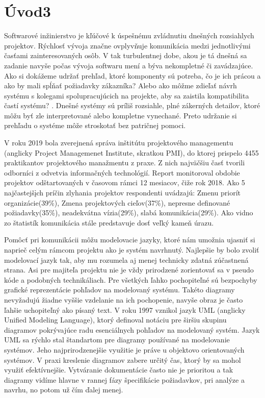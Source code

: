 \chapter{Úvod3}
Softwarové inžinierstvo je kľúčové k úspešnému zvládnutiu dnešných rozsiahlych projektov. Rýchlosť vývoja značne ovplyvňuje komunikácia medzi jednotlivými časťami zainteresovaných osôb. 
V tak turbulentnej dobe, akou je tá dnešná sa zadanie navyše počas vývoja softwaru mení a býva nekompletné či zavádzajúce.
Ako si dokážeme udržať prehľad, ktoré komponenty sú potreba, čo je ich prácou a ako by mali spĺňať požiadavky zákazníka? Alebo ako môžme zdieľať návrh systému s kolegami spolupracujúcich na projekte, aby sa zaistila kompatibilita častí systému?  \cite{hamilton2006learning}. Dnešné systémy sú príliš rozsiahle, plné zákerných detailov, ktoré môžu byť zle interpretované alebo kompletne vynechané. Preto udržanie si prehľadu o systéme môže stroskotať bez patričnej pomoci. 

V roku 2019 bola zverejnená správa inštitútu projektového managementu (anglicky Project Managemenet Institute, skratkou PMI), do ktorej prispelo 4455 praktikantov projektového manažmentu z praxe. Z nich najväčšiu časť tvorili odborníci z odvetvia informačných technológií. Report monitoroval obdobie projektov odštartovaných v časovom rámci 12 mesiacov, čiže rok 2018. Ako 5 najčastejšįch príčin zlyhania projektov respondenti uvádzajú: Zmenu priorít organizácie(39\%), Zmena projektových cieľov(37\%), nepresne definované požiadavky(35\%), neadekvátna vízia(29\%), slabá komunikácia(29\%).
Ako vidno zo štatistík komunikácia stále predstavuje dosť veľký kameň úrazu.

Pomôcť pri komunikácii môžu modelovacie jazyky, ktoré nám umožnia ujasniť si naprieč celým rámcom projektu ako je systém navrhnutý. Najlepšie by bolo zvoliť modelovací jazyk tak, aby mu rozumela aj menej technicky zdatná zúčastnená strana. Asi pre majiteľa projektu nie je vždy prirodzené zorientovať sa v pseudo kóde a podobných technikáliach. Pre všetkých ľahko pochopiteľné sú bezpochyby grafické reprezentácie pohľadov na modelovaný systému. Takéto diagramy nevyžadujú žiadne vyššie vzdelanie na ich pochopenie, navyše obraz je často ľahšie uchopiteľný ako písaný text. V roku 1997 vznikol jazyk UML (anglicky Unified Modeling Language), ktorý definoval notáciu pre širšiu skupinu diagramov pokrývajúce radu esenciálnych pohľadov na modelovaný systém. Jazyk UML sa rýchlo stal štandartom pre diagramy používané na modelovanie systémov. Jeho najprirodzenejšie využitie je práve u objektovo orientovaných systémov. V praxi kreslenie diagramov zabere určitý čas, ktorý by sa mohol využiť efektívnejšie. Vytváranie dokumentácie často nie je prioritou a tak diagramy vidíme hlavne v rannej fázy špecifikácie požiadavkov, pri analýze a navrhu, no potom už čím ďalej menej.

